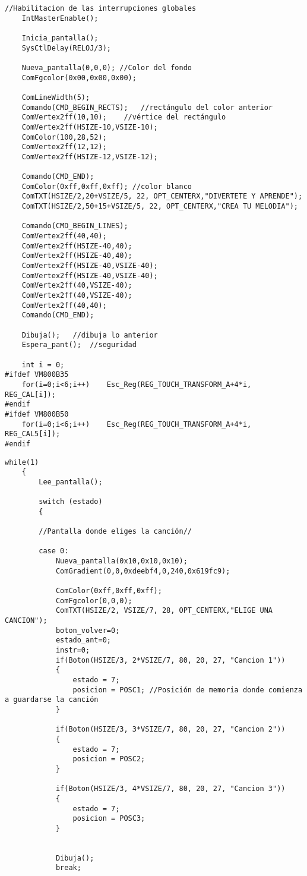\documentclass[12pt,a4paper]{article}
\begin{document}
\begin{lstlisting}[basicstyle=\footnotesize]
    //Habilitacion de las interrupciones globales
    IntMasterEnable();

    Inicia_pantalla();
    SysCtlDelay(RELOJ/3);

    Nueva_pantalla(0,0,0); //Color del fondo
    ComFgcolor(0x00,0x00,0x00);

    ComLineWidth(5);
    Comando(CMD_BEGIN_RECTS);   //rectángulo del color anterior
    ComVertex2ff(10,10);    //vértice del rectángulo
    ComVertex2ff(HSIZE-10,VSIZE-10);
    ComColor(100,28,52);
    ComVertex2ff(12,12);
    ComVertex2ff(HSIZE-12,VSIZE-12);

    Comando(CMD_END);
    ComColor(0xff,0xff,0xff); //color blanco
    ComTXT(HSIZE/2,20+VSIZE/5, 22, OPT_CENTERX,"DIVERTETE Y APRENDE");
    ComTXT(HSIZE/2,50+15+VSIZE/5, 22, OPT_CENTERX,"CREA TU MELODIA");

    Comando(CMD_BEGIN_LINES);
    ComVertex2ff(40,40);
    ComVertex2ff(HSIZE-40,40);
    ComVertex2ff(HSIZE-40,40);
    ComVertex2ff(HSIZE-40,VSIZE-40);
    ComVertex2ff(HSIZE-40,VSIZE-40);
    ComVertex2ff(40,VSIZE-40);
    ComVertex2ff(40,VSIZE-40);
    ComVertex2ff(40,40);
    Comando(CMD_END);

    Dibuja();   //dibuja lo anterior
    Espera_pant();  //seguridad

    int i = 0;
#ifdef VM800B35
    for(i=0;i<6;i++)    Esc_Reg(REG_TOUCH_TRANSFORM_A+4*i, REG_CAL[i]);
#endif
#ifdef VM800B50
    for(i=0;i<6;i++)    Esc_Reg(REG_TOUCH_TRANSFORM_A+4*i, REG_CAL5[i]);
#endif
\end{lstlisting}

\begin{lstlisting}[basicstyle=\footnotesize] 
    while(1)
    {
        Lee_pantalla();

        switch (estado)
        {

        //Pantalla donde eliges la canción//

        case 0:
            Nueva_pantalla(0x10,0x10,0x10);
            ComGradient(0,0,0xdeebf4,0,240,0x619fc9);

            ComColor(0xff,0xff,0xff);
            ComFgcolor(0,0,0);
            ComTXT(HSIZE/2, VSIZE/7, 28, OPT_CENTERX,"ELIGE UNA CANCION");
            boton_volver=0;
            estado_ant=0;
            instr=0;
            if(Boton(HSIZE/3, 2*VSIZE/7, 80, 20, 27, "Cancion 1"))
            {
                estado = 7;
                posicion = POSC1; //Posición de memoria donde comienza a guardarse la canción
            }

            if(Boton(HSIZE/3, 3*VSIZE/7, 80, 20, 27, "Cancion 2"))
            {
                estado = 7;
                posicion = POSC2;
            }

            if(Boton(HSIZE/3, 4*VSIZE/7, 80, 20, 27, "Cancion 3"))
            {
                estado = 7;
                posicion = POSC3;
            }


            Dibuja();
            break;
\end{lstlisting}
\end{document}
